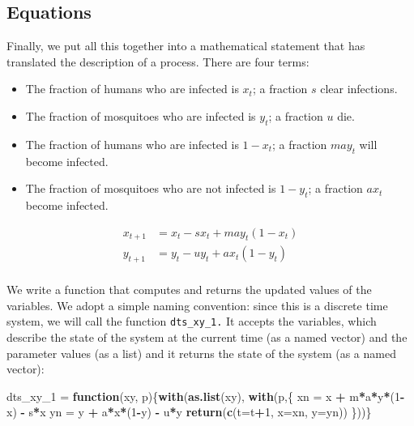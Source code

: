 \documentclass[
]{book}
\newenvironment{Shaded}{\begin{snugshade}}{\end{snugshade}}
\newcommand{\AttributeTok}[1]{\textcolor[rgb]{0.13,0.29,0.53}{#1}}
\newcommand{\ControlFlowTok}[1]{\textcolor[rgb]{0.13,0.29,0.53}{\textbf{#1}}}
\newcommand{\DecValTok}[1]{\textcolor[rgb]{0.00,0.00,0.81}{#1}}
\newcommand{\FunctionTok}[1]{\textcolor[rgb]{0.13,0.29,0.53}{\textbf{#1}}}
\newcommand{\NormalTok}[1]{#1}
\newcommand{\OtherTok}[1]{\textcolor[rgb]{0.56,0.35,0.01}{#1}}
\newcommand{\SpecialCharTok}[1]{\textcolor[rgb]{0.81,0.36,0.00}{\textbf{#1}}}
\begin{document}
\subsection{Equations}\label{equations}

Finally, we put all this together into a mathematical statement that has translated the description of a process. There are four terms:

\begin{itemize}
\item
  The fraction of humans who are infected is \(x_t\); a fraction \(s\) clear infections.
\item
  The fraction of mosquitoes who are infected is \(y_t\); a fraction \(u\) die.
\item
  The fraction of humans who are infected is \(1-x_t\); a fraction \(m a y_t\) will become infected.
\item
  The fraction of mosquitoes who are not infected is \(1-y_t\); a fraction \(a x_t\) become infected.
\end{itemize}

\[\begin{array}{rl}
x_{t+1} &=  x_t - s x_t + m a y_t (1-x_t)  \\ 
y_{t+1} &=  y_t - u y_t + a x_t (1 - y_t) \\ 
\end{array}\]

We write a function that computes and returns the updated values of the variables. We adopt a simple naming convention: since this is a discrete time system, we will call the function \texttt{dts\_xy\_1.} It accepts the variables, which describe the state of the system at the current time (as a named vector) and the parameter values (as a list) and it returns the state of the system (as a named vector):

\begin{Shaded}
\begin{Highlighting}[]
\NormalTok{dts\_xy\_1 }\OtherTok{=} \ControlFlowTok{function}\NormalTok{(xy, p)\{}\FunctionTok{with}\NormalTok{(}\FunctionTok{as.list}\NormalTok{(xy), }\FunctionTok{with}\NormalTok{(p,\{}
\NormalTok{  xn }\OtherTok{=}\NormalTok{ x }\SpecialCharTok{+}\NormalTok{ m}\SpecialCharTok{*}\NormalTok{a}\SpecialCharTok{*}\NormalTok{y}\SpecialCharTok{*}\NormalTok{(}\DecValTok{1}\SpecialCharTok{{-}}\NormalTok{x) }\SpecialCharTok{{-}}\NormalTok{ s}\SpecialCharTok{*}\NormalTok{x}
\NormalTok{  yn }\OtherTok{=}\NormalTok{ y }\SpecialCharTok{+}\NormalTok{ a}\SpecialCharTok{*}\NormalTok{x}\SpecialCharTok{*}\NormalTok{(}\DecValTok{1}\SpecialCharTok{{-}}\NormalTok{y) }\SpecialCharTok{{-}}\NormalTok{ u}\SpecialCharTok{*}\NormalTok{y}
  \FunctionTok{return}\NormalTok{(}\FunctionTok{c}\NormalTok{(}\AttributeTok{t=}\NormalTok{t}\SpecialCharTok{+}\DecValTok{1}\NormalTok{, }\AttributeTok{x=}\NormalTok{xn, }\AttributeTok{y=}\NormalTok{yn))}
\NormalTok{\}))\}}
\end{Highlighting}
\end{Shaded}
\end{document}
